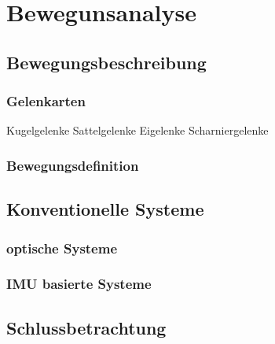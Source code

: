 \chapter{Bewegunsanalyse}
\label{chap:Bewegungsanalyse}
\section{Bewegungsbeschreibung}
\label{sec:anatomy}
\subsection{Gelenkarten}
Kugelgelenke
Sattelgelenke
Eigelenke
Scharniergelenke
\subsection{Bewegungsdefinition}

\section{Konventionelle Systeme}
\subsection{optische Systeme}
\subsection{IMU basierte Systeme}

\section{Schlussbetrachtung}



      
      